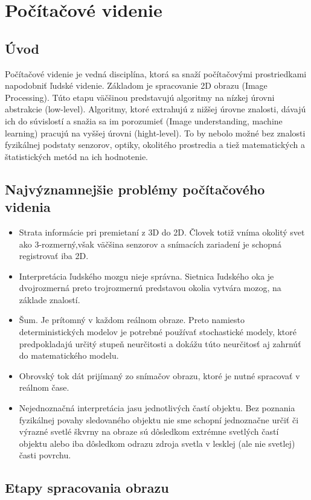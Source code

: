 \chapter{Počítačové videnie}
\section{Úvod}
Počítačové videnie je vedná disciplína, ktorá sa snaží počítačovými prostriedkami napodobniť ľudské videnie. Základom je spracovanie 2D obrazu (Image Processing). Túto etapu väčšinou predstavujú algoritmy na nízkej úrovni abstrakcie (low-level). Algoritmy, ktoré extrahujú z nižšej úrovne znalosti, dávajú ich do súvislostí a snažia sa im porozumieť (Image understanding, machine learning) pracujú na vyššej úrovni (hight-level). To by nebolo možné bez znalosti fyzikálnej podstaty senzorov, optiky, okolitého prostredia a tiež matematických a štatistických metód na ich hodnotenie.

\section{Najvýznamnejšie problémy počítačového videnia}
\begin{itemize}
\item Strata informácie pri premietaní z 3D do 2D. Človek totiž vníma okolitý svet ako 3-rozmerný,však väčšina senzorov a snímacích zariadení je schopná registrovať iba 2D.
\item Interpretácia ľudského mozgu nieje správna. Sietnica ľudského oka je dvojrozmerná preto trojrozmernú predstavou okolia vytvára mozog, na základe znalostí.
\item Šum. Je prítomný v každom reálnom obraze. Preto namiesto deterministických modelov je potrebné používať stochastické modely, ktoré predpokladajú určitý stupeň neurčitosti a dokážu túto neurčitosť aj zahrnúť do matematického modelu.
\item Obrovský tok dát prijímaný zo snímačov obrazu, ktoré je nutné spracovať v reálnom čase.
\item Nejednoznačná interpretácia jasu jednotlivých častí objektu. Bez poznania fyzikálnej povahy sledovaného objektu nie sme schopní jednoznačne určiť či výrazné svetlé škvrny na obraze sú dôsledkom extrémne svetlých častí objektu alebo iba dôsledkom odrazu zdroja svetla v lesklej (ale nie svetlej) časti povrchu.
\end{itemize}


\section{Etapy spracovania obrazu}


